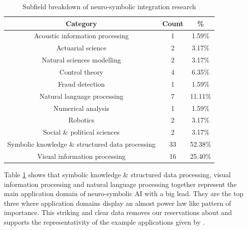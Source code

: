 \begin{table}[!htbp]
\centering
\begin{tabular}{ |c|c|c| }
 \hline
 \textbf{Category} & \textbf{Count} & \textbf{\%} \\
 \hline
 Acoustic information processing & 1 & 1.59\% \\
 \hline
 Actuarial science & 2 & 3.17\% \\
 \hline
 Natural sciences modelling & 2 & 3.17\% \\
 \hline
 Control theory & 4 & 6.35\% \\
 \hline
 Fraud detection & 1 & 1.59\% \\
 \hline
 Natural language processing & 7 & 11.11\% \\
 \hline
 Numerical analysis & 1 & 1.59\% \\
 \hline
 Robotics & 2 & 3.17\% \\
 \hline
 Social \& political sciences & 2 & 3.17\% \\
 \hline
 Symbolic knowledge \& structured data processing & 33 & 52.38\%  \\
 \hline
 Visual information processing & 16 & 25.40\%  \\
 \hline
\end{tabular}
\caption{Subfield breakdown of neuro-symbolic integration research}
\label{subject_breakdown}
\end{table}
Table \ref{subject_breakdown} shows that symbolic knowledge \& structured data processing, visual information processing and natural language processing together represent the main application domain of neuro-symbolic AI with a big lead. They are the top three where application domains display an almost power law like pattern of importance. This striking and clear data removes our reservations about and supports the representativity of the example applications given by \cite{manhaeve2018deepproblog}.